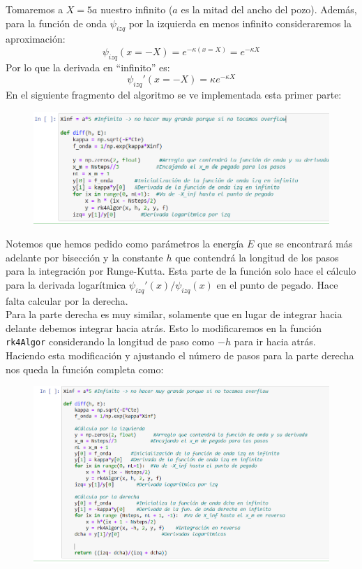 \documentclass[11pt]{article}
\begin{document}
	Tomaremos a $X = 5a$ nuestro infinito ($a$ es la mitad del ancho del pozo). Además, para la función de onda $\psi_{izq}$ por la izquierda en menos infinito consideraremos la aproximación:
	$$\psi_{izq}( x= -X) = e^{-\kappa (x=X)} = e^{-\kappa X}$$
	Por lo que la derivada en ``infinito'' es:
	$$\psi_{izq}'( x = -X) =  \kappa e^{-\kappa X}$$
	En el siguiente fragmento del algoritmo se ve implementada esta primer parte:
	\begin{figure}[h]
		\centering
		\includegraphics[width=15cm]{Img/2.6.PNG}
	\end{figure}
	
	Notemos que hemos pedido como parámetros la energía $E$ que se encontrará más adelante por bisección y la constante $h$ que contendrá la longitud de los pasos para la integración por Runge-Kutta. Esta parte de la función solo hace el cálculo para la derivada logarítmica $\psi_{izq}'(x)/ \psi_{izq}(x)$ en el punto de pegado. Hace falta calcular por la derecha.\\
	Para la parte derecha es muy similar, solamente que en lugar de integrar hacia delante debemos integrar hacia atrás. Esto lo modificaremos en la función \texttt{rk4Algor} considerando la longitud de paso como $-h$ para ir hacia atrás. Haciendo esta modificación y ajustando el número de pasos para la parte derecha nos queda la función completa como:
\newpage
	\begin{figure}[h]
		\centering
		\includegraphics[width=13cm]{Img/2.7.PNG}
	\end{figure}
	 
\end{document}
